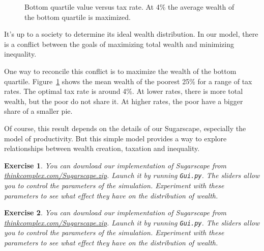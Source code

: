\documentclass[10pt]{book}
\newtheorem{exercise}{Exercise}[chapter]
\begin{document}
\begin{figure}[ht]
\caption{Bottom quartile value versus tax rate. At 4\% the average wealth of the bottom quartile is maximized.\label{fig.optimal}}
\end{figure}


It's up to a society to determine its ideal wealth distribution. 
In our model, there is a conflict between the goals of maximizing
total wealth and minimizing inequality.

One way to reconcile this conflict is to maximize the wealth of
the bottom quartile.  Figure~\ref{fig.optimal} shows the mean
wealth of the poorest 25\% for a range of tax rates.  The optimal
tax rate is around 4\%.  At lower rates, there is more total
wealth, but the poor do not share it.  At higher rates, the poor
have a bigger share of a smaller pie.

Of course, this result depends on the details of our Sugarscape,
especially the model of productivity.  But this simple model
provides a way to explore relationships between wealth creation,
taxation and inequality.

\begin{exercise}

You can download our implementation of Sugarscape from
\url{thinkcomplex.com/Sugarscape.zip}.  Launch it by running
{\tt Gui.py}.  The sliders allow you to control the parameters
of the simulation.  Experiment with these parameters to see what
effect they have on the distribution of wealth.

\end{exercise}

\begin{exercise}

You can download our implementation of Sugarscape from
\url{thinkcomplex.com/Sugarscape.zip}.  Launch it by running
{\tt Gui.py}.  The sliders allow you to control the parameters
of the simulation.  Experiment with these parameters to see what
effect they have on the distribution of wealth.

\end{exercise}
\end{document}

